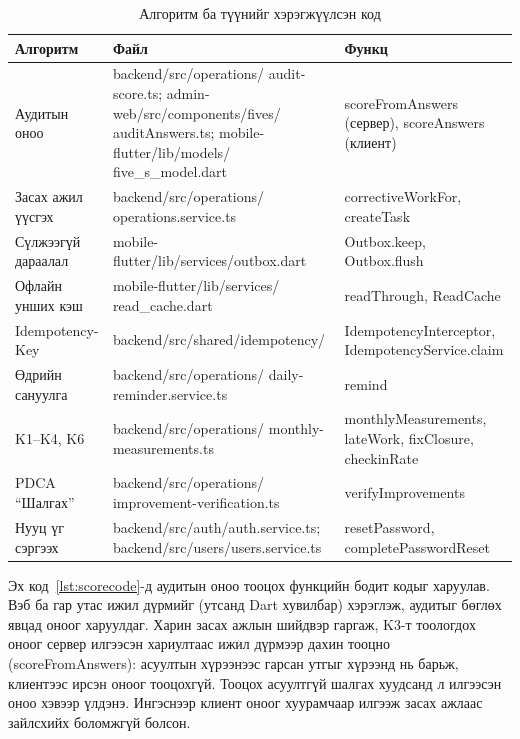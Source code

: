 \begin{table}[H]
\centering
\caption{Алгоритм ба түүнийг хэрэгжүүлсэн код}
\label{table:algocode}
\begin{tabular}{|L{3.6cm}|L{6.6cm}|L{4.2cm}|}
\hline
\textbf{Алгоритм} & \textbf{Файл} & \textbf{Функц} \\ \hline
Аудитын оноо & backend/src/operations/ audit-score.ts; admin-web/src/components/fives/ auditAnswers.ts; mobile-flutter/lib/models/ five\_s\_model.dart & scoreFromAnswers (сервер), scoreAnswers (клиент) \\ \hline
Засах ажил үүсгэх & backend/src/operations/ operations.service.ts & correctiveWorkFor, createTask \\ \hline
Сүлжээгүй дараалал & mobile-flutter/lib/services/outbox.dart & Outbox.keep, Outbox.flush \\ \hline
Офлайн унших кэш & mobile-flutter/lib/services/ read\_cache.dart & readThrough, ReadCache \\ \hline
Idempotency-Key & backend/src/shared/idempotency/ & Idempotency\-Interceptor, Idempotency\-Service.claim \\ \hline
Өдрийн сануулга & backend/src/operations/ daily-reminder.service.ts & remind \\ \hline
K1--K4, K6 & backend/src/operations/ monthly-measurements.ts & monthlyMeasurements, lateWork, fixClosure, checkinRate \\ \hline
PDCA ``Шалгах'' & backend/src/operations/ improvement-verification.ts & verifyImprovements \\ \hline
Нууц үг сэргээх & backend/src/auth/auth.service.ts; backend/src/users/users.service.ts & resetPassword, complete\-Password\-Reset \\ \hline
\end{tabular}
\end{table}

Эх код~\ref{lst:scorecode}-д аудитын оноо тооцох функцийн бодит кодыг харуулав. Вэб ба гар утас ижил дүрмийг (утсанд Dart хувилбар) хэрэглэж, аудитыг бөглөх явцад оноог харуулдаг. Харин засах ажлын шийдвэр гаргаж, K3-т тоологдох оноог сервер илгээсэн хариултаас ижил дүрмээр дахин тооцно (scoreFromAnswers): асуултын хүрээнээс гарсан утгыг хүрээнд нь барьж, клиентээс ирсэн оноог тооцохгүй. Тооцох асуултгүй шалгах хуудсанд л илгээсэн оноо хэвээр үлдэнэ. Ингэснээр клиент оноог хуурамчаар илгээж засах ажлаас зайлсхийх боломжгүй болсон.

